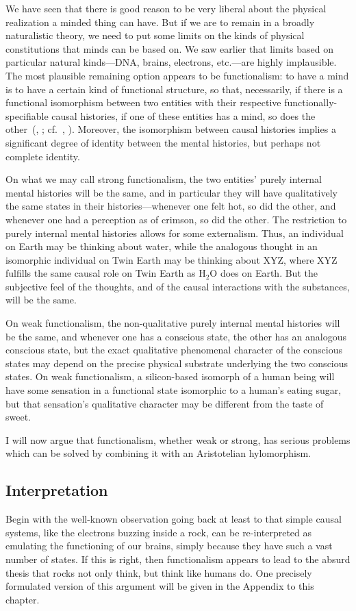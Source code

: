 We have seen that there is good reason to be very liberal about the physical realization a minded thing can have.  But 
if we are to remain in a broadly naturalistic theory, we need to put some limits on the kinds of physical constitutions that
minds can be based on. We saw earlier that limits based on particular natural kinds---DNA, brains, electrons, etc.---are highly
implausible. The most plausible remaining option appears to be functionalism: to have a mind is to have a certain kind of functional structure,
so that, necessarily, if there is a functional isomorphism between two entities with their respective functionally-specifiable 
causal histories, if one of these entities has a mind, so does the other~(\citeauthor{Putnam1975}, \citeyear{Putnam1975}; cf.\ \citeauthor{Lewis1972}, \citeyear{Lewis1972}). Moreover, the isomorphism between causal histories implies
a significant degree of identity between the mental histories, but perhaps not complete identity.

On what we may call strong functionalism, the two entities' purely internal mental histories
will be the same, and in particular they will have qualitatively the same states in their histories---whenever one felt hot, so did
the other, and whenever one had a perception as of crimson, so did the other. The restriction to purely internal mental histories allows
for some externalism. Thus, an individual on Earth may be thinking about water, while the analogous thought in an isomorphic individual
on Twin Earth may be thinking about XYZ, where XYZ fulfills the same causal role on Twin Earth as H$_2$O does on Earth. 
But the subjective feel of the thoughts, and of the causal interactions with the substances, will be the same.

On weak functionalism, the non-qualitative purely internal mental histories will be the same, and whenever one has a conscious state, 
the other has an analogous conscious state, but the exact qualitative phenomenal character of the conscious states may depend on 
the precise physical substrate underlying the two conscious states. On weak functionalism, a silicon-based isomorph of a human being
will have some sensation in a functional state isomorphic to a human's eating sugar, but that sensation's qualitative character may
be different from the taste of sweet. 

I will now argue that functionalism, whether weak or strong, has serious problems which can be solved by combining it with an Aristotelian hylomorphism.

\subsection{Interpretation}
Begin with the well-known observation going back at least to  that simple causal systems, like the electrons buzzing inside a rock, can be re-interpreted as 
emulating the functioning of our brains, simply because they have such a vast number of states. If this is right, then functionalism 
appears to lead to the absurd thesis that rocks not only think, but think like humans do. One precisely formulated
version of this argument will be given in the Appendix to this chapter.


